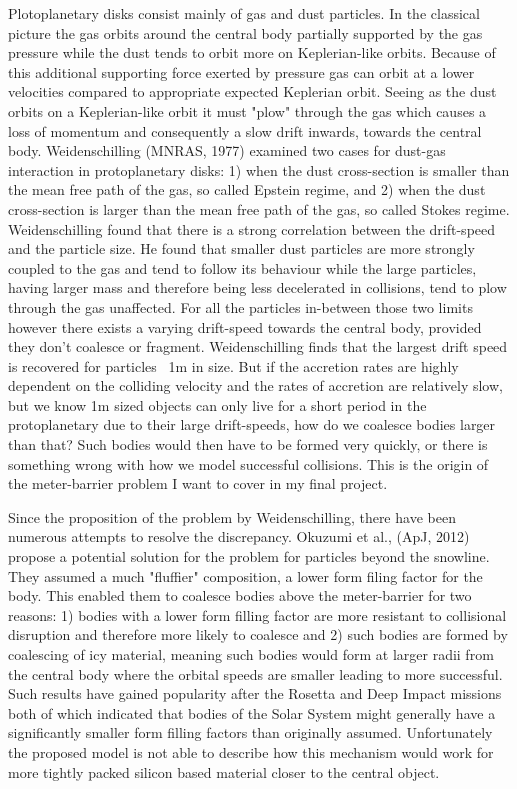 \documentclass[12pt,letterpaper]{article}
\begin{document}
Plotoplanetary disks consist mainly of gas and dust particles. In the classical picture the gas orbits around the central body partially supported by the gas pressure while the dust tends to orbit more on Keplerian-like orbits. Because of this additional supporting force exerted by pressure gas can orbit at a lower velocities compared to appropriate expected Keplerian orbit. Seeing as the dust orbits on a Keplerian-like orbit it must "plow" through the gas which causes a loss of momentum and consequently a slow drift inwards, towards the central body. Weidenschilling (MNRAS, 1977) examined two cases for dust-gas interaction in protoplanetary disks: 1) when the dust cross-section is smaller than the mean free path of the gas, so called Epstein regime, and 2) when the dust cross-section is larger than the mean free path of the gas, so called Stokes regime. Weidenschilling found that there is a strong correlation between the drift-speed and the particle size. He found that smaller dust particles are more strongly coupled to the gas and tend to follow its behaviour while the large particles, having larger mass and therefore being less decelerated in collisions, tend to plow through the gas unaffected. For all the particles in-between those two limits however there exists a varying drift-speed towards the central body, provided they don't coalesce or fragment. Weidenschilling finds that the largest drift speed is recovered for particles ~1m in size. But if the accretion rates are highly dependent on the colliding velocity and the rates of accretion are relatively slow, but we know 1m sized objects can only live for a short period in the protoplanetary due to their large drift-speeds, how do we coalesce bodies larger than that? Such bodies would then have to be formed very quickly, or there is something wrong with how we model successful collisions. This is the origin of the meter-barrier problem I want to cover in my final project.

Since the proposition of the problem by Weidenschilling, there have been numerous attempts to resolve the discrepancy. Okuzumi et al., (ApJ, 2012) propose a potential solution for the problem for particles beyond the snowline. They assumed a much "fluffier" composition, a lower form filing factor for the body. This enabled them to coalesce bodies above the meter-barrier for two reasons: 1) bodies with a lower form filling factor are more resistant to collisional disruption and therefore more likely to coalesce and 2) such bodies are formed by coalescing of icy material, meaning such bodies would form at larger radii from the central body where the orbital speeds are smaller leading to more successful. Such results have gained popularity after the Rosetta and Deep Impact missions both of which indicated that bodies of the Solar System might generally have a significantly smaller form filling factors than originally assumed. Unfortunately the proposed model is not able to describe how this mechanism would work for more tightly packed silicon based material closer to the central object.
\end{document}
